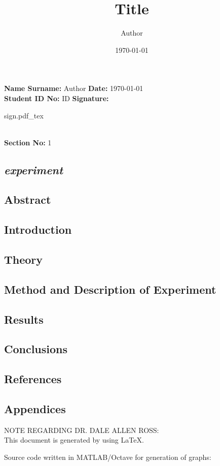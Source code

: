 \documentclass[a4paper, 12pt]{article}
\newcommand{\head}[1]{\section{\normalsize{\textit{#1}}}}
\newcommand{\subhead}[1]{\subsection{\normalsize{#1}}}
\newcommand{\incfig}[1]{%
    \def\svgwidth{\columnwidth}
    {#1.pdf_tex}
}
\begin{document}
    \title{Title}
    \author{Author}
    \date{\today}

    \noindent
    \textbf{Name Surname:} Author
    \hfill \textbf{Date:} \today \\
    \textbf{Student ID No:} ID
    \hfill \textbf{Signature:}
    \begin{minipage}[t]{0.05\linewidth}
        \incfig{sign}
    \end{minipage} \\
    \textbf{Section No:} 1

    \begin{center}
        \head{experiment}
    \end{center}


    \subhead{Abstract}


    \subhead{Introduction}


    \subhead{Theory}


    \subhead{Method and Description of Experiment}


    \subhead{Results}


    \subhead{Conclusions}


    \subhead{References}


    \subhead{Appendices}
    \noindent
    NOTE REGARDING DR. DALE ALLEN ROSS: \\
    This document is generated by using LaTeX.

    \medskip
    \noindent
    Source code written in MATLAB/Octave for generation of graphs:

    \clearpage
\end{document}
